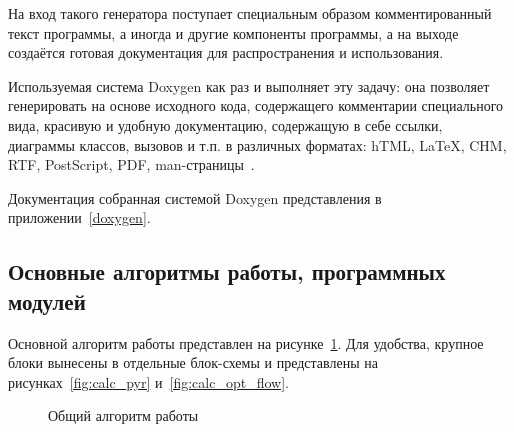 На вход такого генератора поступает специальным образом комментированный текст программы, а иногда и другие компоненты программы, а на выходе создаётся готовая документация для распространения и использования.

Используемая система Doxygen как раз и выполняет эту задачу: она позволяет генерировать на основе исходного кода, содержащего комментарии специального вида, красивую и удобную документацию, содержащую в себе ссылки, диаграммы классов, вызовов и т.п. в различных форматах: hTML, LaTeX, CHM, RTF, PostScript, PDF, man-страницы~\cite{doxygen}.

Документация собранная системой Doxygen представления в приложении~\ref{doxygen}.
\subsection{Основные алгоритмы работы, программных модулей}
Основной алгоритм работы представлен на рисунке~\ref{fig:lucas_kanade_alg}. Для удобства, крупное блоки вынесены в отдельные блок-схемы и представлены на рисунках~\ref{fig:calc_pyr} и~\ref{fig:calc_opt_flow}.
\begin{figure}[h!]
\caption{Общий алгоритм работы}
\label{fig:lucas_kanade_alg}
\end{figure}
